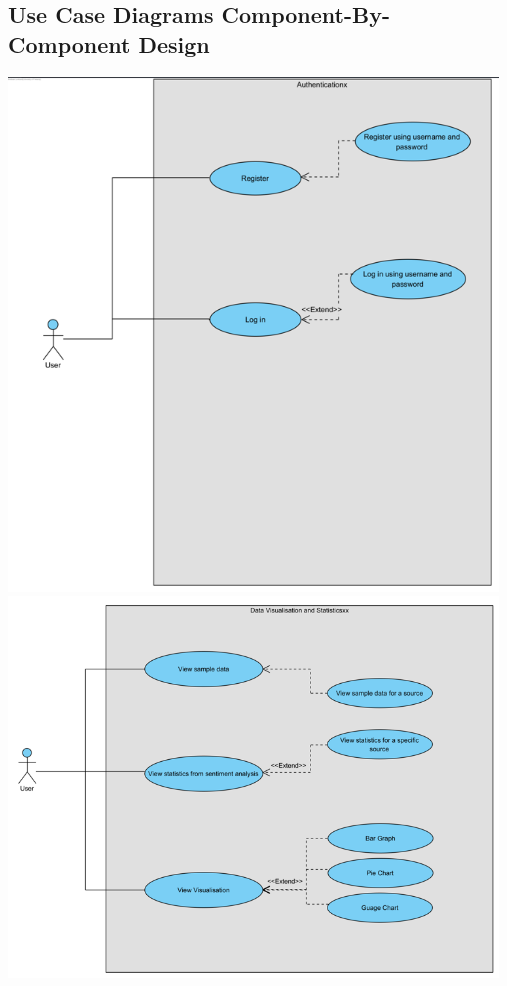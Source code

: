 \documentclass[12pt]{article}
\begin{document}
\subsection{Use Case Diagrams Component-By-Component Design}
\begin{center}
  \includegraphics[width=13cm]{../../Images/UC2.2.1.png}
  \includegraphics[width=13cm]{../../Images/UC2.2.2.png}

\end{center}
\end{document}
